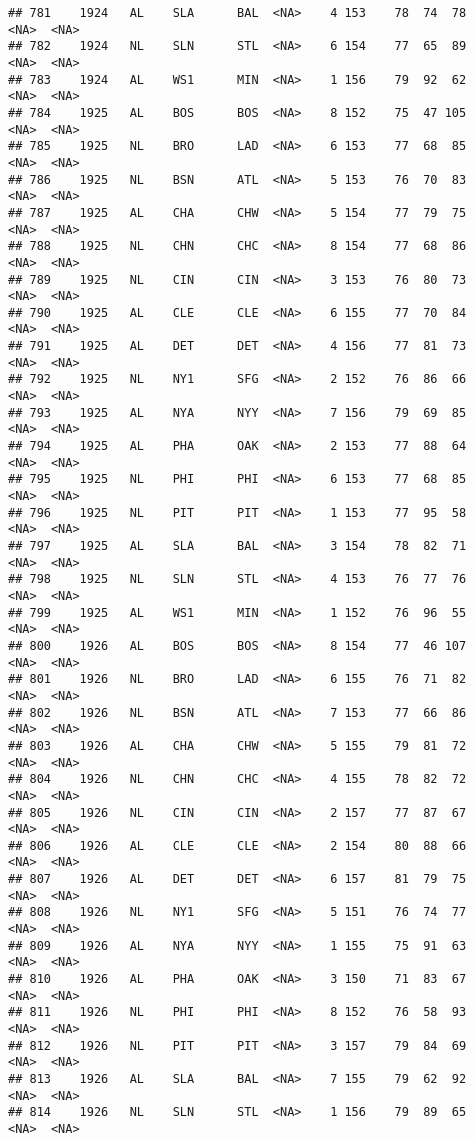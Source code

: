 \documentclass[]{article}
\begin{document}
\begin{verbatim}
## 781    1924   AL    SLA      BAL  <NA>    4 153    78  74  78   <NA>  <NA>
## 782    1924   NL    SLN      STL  <NA>    6 154    77  65  89   <NA>  <NA>
## 783    1924   AL    WS1      MIN  <NA>    1 156    79  92  62   <NA>  <NA>
## 784    1925   AL    BOS      BOS  <NA>    8 152    75  47 105   <NA>  <NA>
## 785    1925   NL    BRO      LAD  <NA>    6 153    77  68  85   <NA>  <NA>
## 786    1925   NL    BSN      ATL  <NA>    5 153    76  70  83   <NA>  <NA>
## 787    1925   AL    CHA      CHW  <NA>    5 154    77  79  75   <NA>  <NA>
## 788    1925   NL    CHN      CHC  <NA>    8 154    77  68  86   <NA>  <NA>
## 789    1925   NL    CIN      CIN  <NA>    3 153    76  80  73   <NA>  <NA>
## 790    1925   AL    CLE      CLE  <NA>    6 155    77  70  84   <NA>  <NA>
## 791    1925   AL    DET      DET  <NA>    4 156    77  81  73   <NA>  <NA>
## 792    1925   NL    NY1      SFG  <NA>    2 152    76  86  66   <NA>  <NA>
## 793    1925   AL    NYA      NYY  <NA>    7 156    79  69  85   <NA>  <NA>
## 794    1925   AL    PHA      OAK  <NA>    2 153    77  88  64   <NA>  <NA>
## 795    1925   NL    PHI      PHI  <NA>    6 153    77  68  85   <NA>  <NA>
## 796    1925   NL    PIT      PIT  <NA>    1 153    77  95  58   <NA>  <NA>
## 797    1925   AL    SLA      BAL  <NA>    3 154    78  82  71   <NA>  <NA>
## 798    1925   NL    SLN      STL  <NA>    4 153    76  77  76   <NA>  <NA>
## 799    1925   AL    WS1      MIN  <NA>    1 152    76  96  55   <NA>  <NA>
## 800    1926   AL    BOS      BOS  <NA>    8 154    77  46 107   <NA>  <NA>
## 801    1926   NL    BRO      LAD  <NA>    6 155    76  71  82   <NA>  <NA>
## 802    1926   NL    BSN      ATL  <NA>    7 153    77  66  86   <NA>  <NA>
## 803    1926   AL    CHA      CHW  <NA>    5 155    79  81  72   <NA>  <NA>
## 804    1926   NL    CHN      CHC  <NA>    4 155    78  82  72   <NA>  <NA>
## 805    1926   NL    CIN      CIN  <NA>    2 157    77  87  67   <NA>  <NA>
## 806    1926   AL    CLE      CLE  <NA>    2 154    80  88  66   <NA>  <NA>
## 807    1926   AL    DET      DET  <NA>    6 157    81  79  75   <NA>  <NA>
## 808    1926   NL    NY1      SFG  <NA>    5 151    76  74  77   <NA>  <NA>
## 809    1926   AL    NYA      NYY  <NA>    1 155    75  91  63   <NA>  <NA>
## 810    1926   AL    PHA      OAK  <NA>    3 150    71  83  67   <NA>  <NA>
## 811    1926   NL    PHI      PHI  <NA>    8 152    76  58  93   <NA>  <NA>
## 812    1926   NL    PIT      PIT  <NA>    3 157    79  84  69   <NA>  <NA>
## 813    1926   AL    SLA      BAL  <NA>    7 155    79  62  92   <NA>  <NA>
## 814    1926   NL    SLN      STL  <NA>    1 156    79  89  65   <NA>  <NA>

\end{verbatim}
\end{document}
